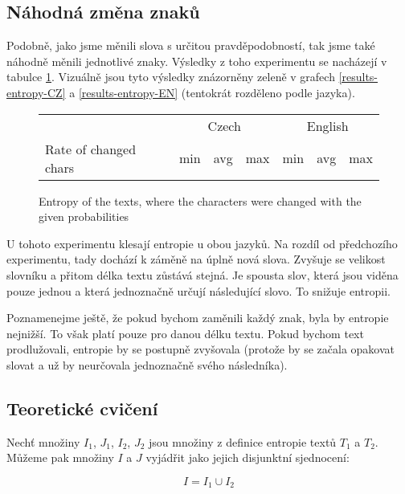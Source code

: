 \documentclass[11pt]{article}
\begin{document}
\subsection{Náhodná změna znaků}

Podobně, jako jsme měnili slova s určitou pravděpodobností, tak jsme také náhodně měnili jednotlivé znaky. 
Výsledky z toho experimentu se nacházejí v tabulce \ref{results-entropy-chars}. Vizuálně jsou tyto výsledky
znázorněny zeleně v grafech \ref{results-entropy-CZ} a \ref{results-entropy-EN} (tentokrát rozděleno podle
jazyka).

\begin{figure}
    \begin{center}
    \begin{tabular}{|l|ccc|ccc|}
        \hline
               & \multicolumn{3}{|c|}{Czech} & \multicolumn{3}{|c|}{English} \\
        Rate of changed chars & min & avg & max & min & avg & max \\
        \hline
        
        \hline
    \end{tabular}
    \end{center}
    \caption{Entropy of the texts, where the characters were changed with the given probabilities}
    \label{results-entropy-chars}
\end{figure}

U tohoto experimentu klesají entropie u obou jazyků. Na rozdíl od předchozího experimentu, tady
dochází k záměně na úplně nová slova. Zvyšuje se velikost slovníku a přitom délka textu zůstává stejná.
Je spousta slov, která jsou viděna pouze jednou a která jednoznačně určují následující slovo. To snižuje
entropii.

Poznamenejme ještě, že pokud bychom zaměnili každý znak, byla by entropie nejnižší. To však platí pouze
pro danou délku textu. Pokud bychom text prodlužovali, entropie by se postupně zvyšovala (protože by
se začala opakovat slovat a už by neurčovala jednoznačně svého následníka).

\subsection{Teoretické cvičení}

Nechť množiny $I_1$, $J_1$, $I_2$, $J_2$ jsou množiny z definice entropie textů $T_1$ a $T_2$.
Můžeme pak množiny $I$ a $J$ vyjádřit jako jejich disjunktní sjednocení:

\begin{equation}
    I = I_1 \cup I_2
\end{equation}
\end{document}
